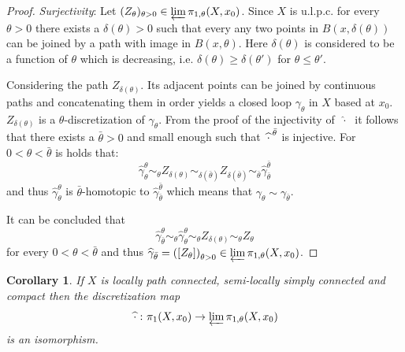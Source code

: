 \documentclass[a4paper, 11pt, twoside]{article}
\theoremstyle{break}
\theoremstyle{break}
\newtheorem{col}[thm]{Corollary}
\begin{document}
\begin{proof}
  \textit{Surjectivity}: Let $(Z_{\theta})_{\theta > 0} \in \varprojlim \pi_{1,\theta}(X, x_0)$. 
  Since $X$ is u.l.p.c. for every $\theta > 0$ there exists a $\delta(\theta) > 0$ such that every any two points in $B(x, \delta(\theta))$ can be joined by a path with image in $B(x, \theta)$.
  Here $\delta(\theta)$ is considered to be a function of $\theta$ which is decreasing, i.e. $\delta(\theta) \geq \delta(\theta')$ for $\theta \leq \theta'$.

  Considering the path $Z_{\delta(\theta)}$. Its adjacent points can be joined by continuous paths and concatenating them in order 
  yields a closed loop $\gamma_{\theta}$ in $X$ based at $x_0$.
  $Z_{\delta(\theta)}$ is a $\theta$-discretization of $\gamma_{\theta}$.
  From the proof of the injectivity of $\; \widehat{\cdot} \;$ it follows that there exists a $\bar{\theta} > 0$ and small enough such that 
  $\: \widehat{\cdot}^{\hspace*{2px}\bar{\theta}}$ is injective. For $0 < \theta < \bar{\theta}$ is holds that:
  \begin{equation*}
    \widehat{\gamma}_{\theta}^{\theta} \sim_{\theta} Z_{\delta(\theta)} \sim_{\delta(\bar{\theta})} Z_{\delta(\bar{\theta})} \sim_{\bar{\theta}} \widehat{\gamma}_{\bar{\theta}}^{{\bar{\theta}}}
  \end{equation*}
  and thus $\widehat{\gamma}_{\theta}^{\theta}$ is $\bar{\theta}$-homotopic to $\widehat{\gamma}_{\bar{\theta}}^{{\bar{\theta}}}$ which means that
  $\gamma_{\theta} \sim \gamma_{\bar{\theta}}$.

  It can be concluded that
  \begin{equation*}
    \widehat{\gamma}_{\bar{\theta}}^{\theta} \sim_{\theta} \widehat{\gamma}_{\theta}^{\theta} \sim_{\theta} Z_{\delta(\theta)} \sim_{\theta} Z_{\theta}
  \end{equation*}
  for every $0 < \theta < \bar{\theta}$ and thus $\widehat{\gamma}_{\bar{\theta}} = \left(\left[Z_{\theta}\right]\right)_{\theta > 0} \in \varprojlim \pi_{1,\theta}(X, x_0)$.
\end{proof}

\begin{col}
  If $X$ is locally path connected, semi-locally simply connected and compact then the discretization map 
  \begin{equation*}
     \hspace*{2px}\widehat{\cdot}\hspace*{2px}\colon \pi_1(X, x_0) \to \varprojlim \pi_{1,\theta}(X, x_0)
  \end{equation*}
  is an isomorphism.
\end{col}
\end{document}
